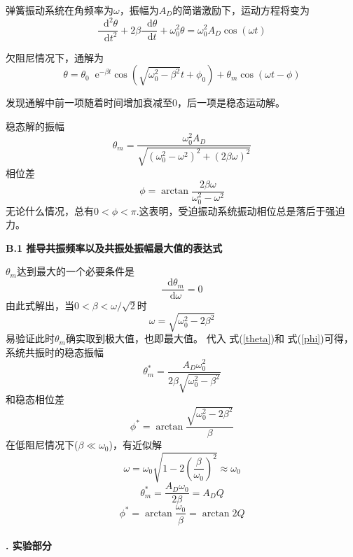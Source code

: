 \documentclass[a4paper,11pt]{article}
\newcommand*{\dif}{\mathop{}\!\mathrm{d}}
\newcommand*{\e}{\mathop{}\!\mathrm{e}}
\begin{document}
        弹簧振动系统在角频率为$\omega$，振幅为$A_D$的简谐激励下，运动方程将变为
        \begin{equation}
            \frac{\dif^2 \theta}{\dif t^2} + 2\beta \frac{\dif \theta}{\dif t} + \omega_0^2 \theta = \omega_0^2 A_D\cos(\omega t)
        \end{equation}

        欠阻尼情况下，通解为
        \begin{equation}
            \theta = \theta_0 \e^{-\beta t} \cos (\sqrt{\omega_0^2 - \beta^2}t + \phi_0) + \theta_m \cos(\omega t - \phi)
            \label{eq: 受迫振动通解}
        \end{equation}

        发现通解中前一项随着时间增加衰减至0，后一项是稳态运动解。

        稳态解的振幅
        \begin{equation}
            \theta_m = \frac{\omega_0^2 A_D}{\sqrt{(\omega_0^2 - \omega^2)^2 + (2\beta\omega)^2}}
            \label{theta}
        \end{equation}
        相位差
        \begin{equation}
            \phi = \arctan \frac{2\beta\omega}{\omega_0^2-\omega^2}
            \label{phi}
        \end{equation}
        无论什么情况，总有$0<\phi<\pi$.这表明，受迫振动系统振动相位总是落后于强迫力。

        \textbf{B.1 推导共振频率以及共振处振幅最大值的表达式}

        $\theta_m$达到最大的一个必要条件是
        \begin{equation}
            \frac{\dif \theta_m}{\dif \omega} = 0
        \end{equation}
        由此式解出，当$0<\beta<\omega / \sqrt2$时
        \begin{equation}
            \omega = \sqrt{\omega_0^2 - 2\beta^2}
        \end{equation}
        易验证此时$\theta_m$确实取到极大值，也即最大值。
        代入 式(\ref{theta})和 式(\ref{phi})可得，系统共振时的稳态振幅
        \begin{equation}
            \theta^*_m = \frac{A_D\omega_0^2}{2\beta\sqrt{\omega_0^2-\beta^2}}
        \end{equation}
        和稳态相位差
        \begin{equation}
            \phi^* = \arctan \frac{\sqrt{\omega_0^2-2\beta^2}}\beta
        \end{equation}
        在低阻尼情况下($\beta \ll \omega_0$)，有近似解
        \begin{equation}
            \omega = \omega_0\sqrt{1-2(\frac\beta{\omega_0})^2} \approx \omega_0
        \end{equation}
        \begin{equation}
            \theta^*_m = \frac{A_D\omega_0}{2\beta} = A_D Q
        \end{equation}
        \begin{equation}
            \phi^* = \arctan \frac{\omega_0}{\beta} = \arctan 2Q
        \end{equation}
    ~\\
    \textbf{. 实验部分}
\end{document}
